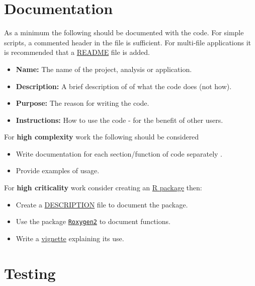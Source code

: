 \documentclass[]{book}
\providecommand{\tightlist}{%
  \setlength{\itemsep}{0pt}\setlength{\parskip}{0pt}}
\theoremstyle{definition}
\theoremstyle{definition}
\theoremstyle{definition}
\theoremstyle{remark}
\begin{document}
\section{Documentation}\label{documentation}

As a minimum the following should be documented with the code. For
simple scripts, a commented header in the file is sufficient. For
multi-file applications it is recommended that a
\href{writing-structure.html\#readme}{README} file is added.

\begin{itemize}
\tightlist
\item
  \textbf{Name:} The name of the project, analysis or application.
\item
  \textbf{Description:} A brief description of of what the code does
  (not how).
\item
  \textbf{Purpose:} The reason for writing the code.
\item
  \textbf{Instructions:} How to use the code - for the benefit of other
  users.
\end{itemize}

For \textbf{high complexity} work the following should be considered

\begin{itemize}
\tightlist
\item
  Write documentation for each section/function of code separately .
\item
  Provide examples of usage.
\end{itemize}

For \textbf{high criticality} work consider creating an
\href{packages-development.html}{R package} then:

\begin{itemize}
\tightlist
\item
  Create a \href{packages-development.html\#description}{DESCRIPTION}
  file to document the package.
\item
  Use the package
  \href{packages-development.html\#documentation}{\texttt{Roxygen2}} to
  document functions.
\item
  Write a \href{packages-development.html\#vignette}{vignette}
  explaining its use.
\end{itemize}

\section{Testing}\label{testing}
\end{document}
